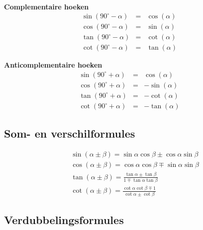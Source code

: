\documentclass[a4paper,12pt]{article}
\begin{document}
\ \\
\begin{minipage}[b]{0.5\linewidth}
\textbf{Complementaire hoeken}
\begin{eqnarray*}
\sin\left(90^\circ-\alpha\right) &=& \cos(\alpha)\\
\cos\left(90^\circ-\alpha\right) &=& \sin(\alpha)\\
\tan\left(90^\circ-\alpha\right) &=& \cot(\alpha)\\
\cot\left(90^\circ-\alpha\right) &=& \tan(\alpha)
\end{eqnarray*}
\end{minipage}
\hspace{0.5cm}
\begin{minipage}[b]{0.5\linewidth}
\textbf{Anticomplementaire hoeken}
\begin{eqnarray*}
\sin\left(90^\circ+\alpha\right) &=& \cos(\alpha)\\
\cos\left(90^\circ+\alpha\right) &=& -\sin(\alpha)\\
\tan\left(90^\circ+\alpha\right) &=& -\cot(\alpha)\\
\cot\left(90^\circ+\alpha\right) &=& -\tan(\alpha)
\end{eqnarray*}
\end{minipage}

\subsection{Som- en verschilformules}

\begin{minipage}[b]{0.6\linewidth}
\begin{eqnarray*}
&&\sin(\alpha \pm \beta) = \sin\alpha\cos\beta \pm \cos\alpha\sin\beta\\
&&\cos(\alpha \pm \beta) = \cos\alpha\cos\beta \mp \sin\alpha\sin\beta\\
&&\tan(\alpha \pm \beta) = \frac{\tan\alpha\pm\tan\beta}{1\mp \tan\alpha\tan\beta} \\
&&\cot(\alpha \pm \beta) = \frac{\cot \alpha \cot\beta \mp 1}{\cot \alpha \pm \cot \beta}
\end{eqnarray*}
\end{minipage}

\subsection{Verdubbelingsformules}
\end{document}
